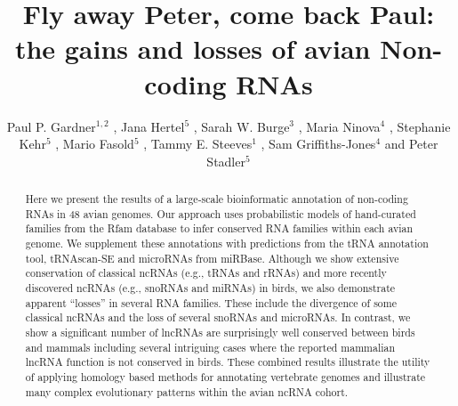\documentclass[10pt]{bmc_article}
\newenvironment{bmcformat}{\begin{raggedright}\baselineskip20pt\sloppy\setboolean{publ}{false}}{\end{raggedright}\baselineskip20pt\sloppy}
\begin{document}
\begin{bmcformat}

\title{Fly away Peter, come back Paul: the gains and losses of avian Non-coding RNAs}

\author{
Paul P. Gardner\correspondingauthor$^{1,2}$
,
Jana Hertel$^5$
,
Sarah W. Burge$^3$
,
Maria Ninova$^4$
,
Stephanie Kehr$^5$
,
Mario Fasold$^5$
,
Tammy E. Steeves$^1$
,
Sam Griffiths-Jones$^4$
and
Peter Stadler\correspondingauthor$^5$
}
\address{
\iid(1) School of Biological Sciences, University of Canterbury, Private Bag 4800, Christchurch, New Zealand.
\iid(2) Biomolecular Interaction Centre, University of Canterbury, Private Bag 4800, Christchurch, New Zealand.
\iid(3) European Molecular Biology Laboratory, European Bioinformatics Institute, Hinxton, Cambridge, CB10 1SD, UK.
\iid(4) Faculty of Life Sciences, University of Manchester, Manchester, United Kingdom.
\iid(5) Bioinformatics Group, Department of Computer Science; and Interdisciplinary Center for Bioinformatics, University of Leipzig, H{\"a}rtelstrasse 16-18, D-04107 Leipzig, Germany
}

\maketitle

\begin{abstract}
Here we present the results of a large-scale bioinformatic annotation
of non-coding RNAs in 48 avian genomes. Our approach uses
probabilistic models of hand-curated families from the Rfam database
to infer conserved RNA families within each avian genome. We
supplement these annotations with predictions from the tRNA annotation
tool, tRNAscan-SE and microRNAs from miRBase. Although we show
extensive conservation of classical ncRNAs (e.g., tRNAs and rRNAs) and
more recently discovered ncRNAs (e.g., snoRNAs and miRNAs) in birds,
we also demonstrate apparent ``losses'' in several RNA families. These
include the divergence of some classical ncRNAs and the loss of
several snoRNAs and microRNAs. In contrast, we show a significant
number of lncRNAs are surprisingly well conserved between birds and
mammals including several intriguing cases where the reported
mammalian lncRNA function is not conserved in birds. These combined
results illustrate the utility of applying homology based methods for
annotating vertebrate genomes and illustrate many complex evolutionary
patterns within the avian ncRNA cohort.
\end{abstract}


\end{bmcformat}
\end{document}
